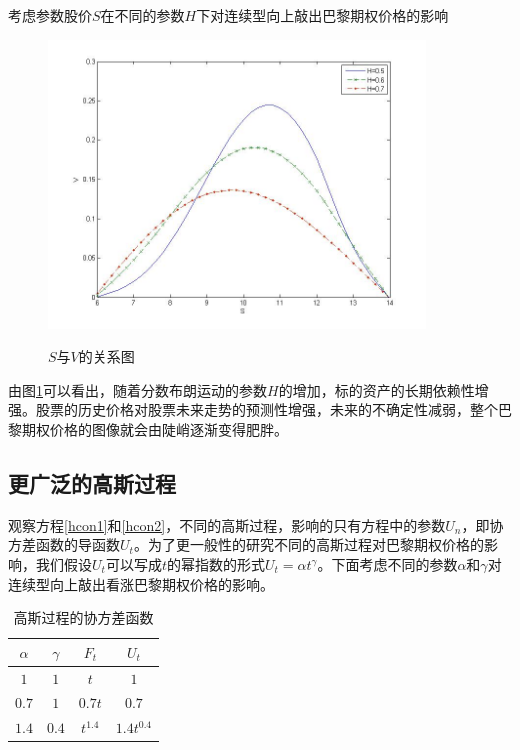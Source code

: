 \documentclass{ctexart} %
\begin{document}
考虑参数股价$S$在不同的参数$H$下对连续型向上敲出巴黎期权价格的影响
\begin{figure}[H]
\begin{center}
\label{paris_fbm}
\includegraphics[width=10cm]{code/paris_fbm.jpg}
\caption{$S$与$V$的关系图}
\end{center}
\end{figure}
由图\ref{paris_fbm}可以看出，随着分数布朗运动的参数$H$的增加，标的资产的长期依赖性增强。股票的历史价格对股票未来走势的预测性增强，未来的不确定性减弱，整个巴黎期权价格的图像就会由陡峭逐渐变得肥胖。
\fi

\subsection{更广泛的高斯过程}
观察方程\eqref{hcon1}和\eqref{hcon2}，不同的高斯过程，影响的只有方程中的参数$U_n$，即协方差函数的导函数$U_t$。为了更一般性的研究不同的高斯过程对巴黎期权价格的影响，我们假设$U_t$可以写成$t$的幂指数的形式$U_t=\alpha t^\gamma$。下面考虑不同的参数$\alpha$和$\gamma$对连续型向上敲出看涨巴黎期权价格的影响。
\begin{table}[!htbp]
\centering
\caption{高斯过程的协方差函数}
\label{tabl2}
\begin{tabular}{c|c|c|c}
\hline
 $\alpha$&$\gamma$&$F_t$ & $U_t$ \\
\hline
$1$&$1$&$t$ & $1$ \\
$0.7$&$1$ & $0.7t$ & $0.7$ \\
$1.4$&$0.4$ & $t^{1.4}$ & $1.4t^{0.4}$ \\
\hline
\end{tabular}
\end{table}
\end{document}
